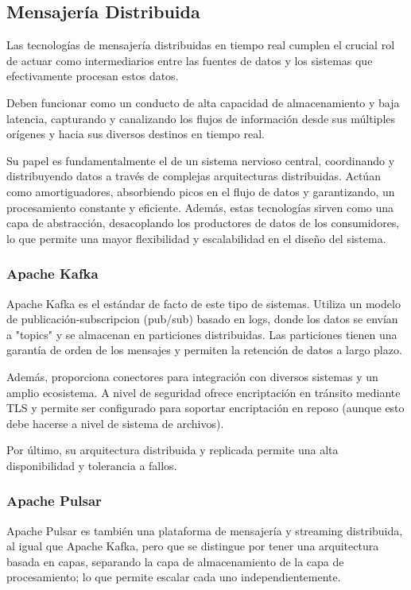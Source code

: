 \subsection{Mensajería Distribuida}

Las tecnologías de mensajería distribuidas en tiempo real cumplen el crucial rol de actuar como intermediarios entre las fuentes de datos 
y los sistemas que efectivamente procesan estos datos. \parencite{kleppmann} \newline

Deben funcionar como un conducto de alta capacidad de almacenamiento y baja latencia, capturando y canalizando los flujos de información
desde sus múltiples orígenes y hacia sus diversos destinos en tiempo real. \parencite{bigdata} \newline

Su papel es fundamentalmente el de un sistema nervioso central, coordinando y distribuyendo datos a través de complejas arquitecturas distribuidas. 
Actúan como amortiguadores, absorbiendo picos en el flujo de datos y garantizando, un procesamiento constante y eficiente. 
Además, estas tecnologías sirven como una capa de abstracción, desacoplando los productores de datos de los consumidores, 
lo que permite una mayor flexibilidad y escalabilidad en el diseño del sistema.

\subsubsection{Apache Kafka}
Apache Kafka es el estándar de facto de este tipo de sistemas. Utiliza un modelo de publicación-subscripcion (pub/sub) basado en logs, 
donde los datos se envían a "topics" y se almacenan en particiones distribuidas. Las particiones tienen una garantía de orden de los mensajes
y permiten la retención de datos a largo plazo.\newline

Además, proporciona conectores para integración con diversos sistemas y un amplio ecosistema. A nivel de seguridad ofrece encriptación
en tránsito mediante TLS y permite ser configurado para soportar encriptación en reposo (aunque esto debe hacerse a nivel de sistema de archivos).
\newline

Por último, su arquitectura distribuida y replicada permite una alta disponibilidad y tolerancia a fallos.

\newpage
\subsubsection{Apache Pulsar}
Apache Pulsar es también una plataforma de mensajería y streaming distribuida, al igual que Apache Kafka, pero que se distingue por tener una 
arquitectura basada en capas, separando la capa de almacenamiento de la capa de procesamiento; lo que permite escalar cada uno independientemente.
\newline

